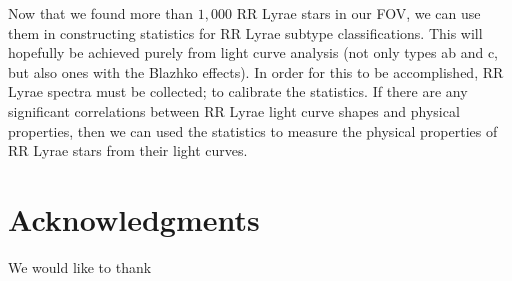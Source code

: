 \documentclass[aps,prb,twocolumn,superscriptaddress]{revtex4-1}
\begin{document}
\indent Now that we found more than $1,000$ RR Lyrae stars in our FOV, we can use them in constructing statistics for RR Lyrae subtype classifications.  This will hopefully be achieved purely from light curve analysis (not only types ab and c, but also ones with the Blazhko effects). In order for this to be accomplished, RR Lyrae spectra must be collected; to calibrate the statistics.  
If there are any significant correlations between RR Lyrae light curve shapes and physical properties, then we can used the statistics to measure the physical properties of RR Lyrae stars from their light curves.








\section*{Acknowledgments}
We would like to thank   %
\end{document}
